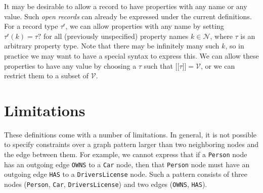 \documentclass[a4paper]{article}
\newcommand{\ptype}{\tau}
\newcommand{\rtype}{\tau^\mathsf{r}}
\newcommand{\otype}{\tau^\mathsf{o}}
\newcommand{\lsem}{\ensuremath{[\![}}
\newcommand{\rsem}{\ensuremath{]\!]}}
\newcommand{\sem}[1]{\ensuremath{\lsem #1 \rsem}}
\begin{document}
It may be desirable to allow a record to have properties with any name or any value. Such \emph{open records} can already be expressed under the current definitions. For a record type $\rtype$, we can allow properties with any name by setting $\rtype(k) = \ptype?$ for all (previously unspecified) property names $k \in \mathcal{N}$, where $\ptype$ is an arbitrary property type. Note that there may be infinitely many such $k$, so in practice we may want to have a special syntax to express this. We can allow these properties to have any value by choosing a $\ptype$ such that $\sem{\ptype} = \mathcal{V}$, or we can restrict them to a subset of $\mathcal{V}$.

\section{Limitations}

These definitions come with a number of limitations. In general, it is not possible to specify constraints over a graph pattern larger than two neighboring nodes and the edge between them. For example, we cannot express that if a \texttt{Person} node has an outgoing edge \texttt{OWNS} to a \texttt{Car} node, then that \texttt{Person} node must have an outgoing edge \texttt{HAS} to a \texttt{DriversLicense} node. Such a pattern consists of three nodes (\texttt{Person}, \texttt{Car}, \texttt{DriversLicense}) and two edges (\texttt{OWNS}, \texttt{HAS}).




\end{document}
